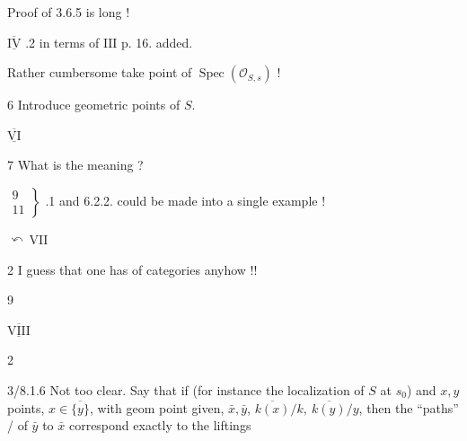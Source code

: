 Proof of 3.6.5 is  long !

$\underline{\overline{\mathrm{IV}}}$ \quad {} .2 \quad {} in terms of $\mathrm{III}$ p. 16. added.

Rather  cumbersome\unsure{;|,} take point of $\operatorname{Spec}(\mathcal O_{S,s})$ !

6 \qquad Introduce geometric points of $S$.

$\underline{\overline{\mathrm{VI}}}$  \quad {}

7 \quad What is the meaning ?

$\left.\begin{gathered}9\\11\end{gathered}\right\}$ .1 and 6.2.2. could be made into a single example !

$\curvearrowleft\ \mathrm{VII}$ 

2 \quad I guess that one has  of categories anyhow !!

9

$\underline{\overline{\mathrm{VIII}}}$ 

2

3/8.1.6 Not too clear. Say that if
 
(for instance the localization of $S$ at $s_0$) and
$x,y$  points, $x\in\overline{\{y\}}$,
 with geom point given, $\bar x,\bar y$,
$\overline{k(x)}/k,\ \overline{k(y)}/y$, then the ``paths'' / of $\bar y$ to $\bar x$
correspond exactly to the  liftings


